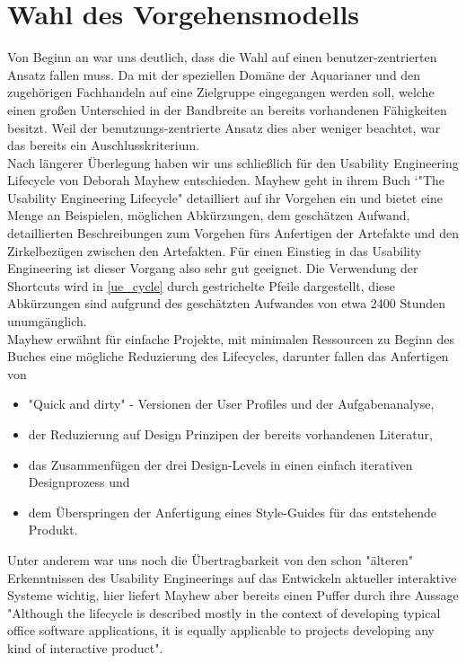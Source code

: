 \chapter{Wahl des Vorgehensmodells}
Von Beginn an war uns deutlich, dass die Wahl auf einen benutzer-zentrierten Ansatz fallen muss. Da mit der speziellen Domäne der Aquarianer und den zugehörigen Fachhandeln auf eine Zielgruppe eingegangen werden soll, welche einen großen Unterschied in der Bandbreite an bereits vorhandenen Fähigkeiten besitzt. Weil der benutzungs-zentrierte Ansatz dies aber weniger beachtet, war das bereits ein Auschlusskriterium.\\
 
Nach längerer Überlegung haben wir uns schließlich für den Usability Engineering Lifecycle von Deborah Mayhew entschieden. Mayhew geht in ihrem Buch `"The Usability Engineering Lifecycle" detailliert auf ihr Vorgehen ein und bietet eine Menge an Beispielen, möglichen Abkürzungen, dem geschätzen Aufwand, detaillierten Beschreibungen zum Vorgehen fürs Anfertigen der Artefakte und den Zirkelbezügen zwischen den Artefakten. Für einen Einstieg in das Usability Engineering ist dieser Vorgang also sehr gut geeignet. 
Die Verwendung der Shortcuts wird in \ref{ue_cycle} durch gestrichelte Pfeile dargestellt, diese Abkürzungen sind aufgrund des geschätzten Aufwandes von etwa 2400 Stunden unumgänglich.\\
Mayhew erwähnt für einfache Projekte, mit minimalen Ressourcen zu Beginn des Buches eine mögliche Reduzierung des Lifecycles\cite[25]{Mayhew:UEL}, darunter fallen das Anfertigen von 
\begin{itemize}
 \item "Quick and dirty" - Versionen der User Profiles und der Aufgabenanalyse,
 \item der Reduzierung auf Design Prinzipen der bereits vorhandenen Literatur,
 \item das Zusammenfügen der drei Design-Levels in einen einfach iterativen Designprozess und
 \item dem Überspringen der Anfertigung eines Style-Guides für das entstehende Produkt.
\end{itemize}

Unter anderem war uns noch die Übertragbarkeit von den schon "älteren" Erkenntnissen des Usability Engineerings auf das Entwickeln aktueller interaktive Systeme wichtig, hier liefert Mayhew aber bereits einen Puffer durch ihre Aussage "Although the lifecycle is described mostly in the context of developing typical office software applications, it is equally applicable to projects developing any kind of interactive product".\cite[5]{Mayhew:UEL}

